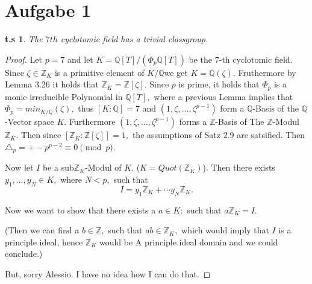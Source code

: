 \documentclass[10pt,a4paper]{article}
\date{\today}
\newtheorem*{zz*}{t.s}
\newcommand{\QQ}{\mathbb{Q}}
\newcommand{\ZZ}{\mathbb{Z}}
\begin{document}
	
	\section*{Aufgabe 1}
	\begin{zz*}
		The $7th$ cyclotomic field has a trivial classgroup.
	\end{zz*}
	\begin{proof}
		Let $p = 7$ and let $K = \QQ[T]/(\Phi_p\QQ[T])$ be the $7$-th cyclotomic field. Since $\zeta\in \ZZ_K$  is a primitive element of $K/\QQ$we get $K = \QQ(\zeta).$ Fruthermore by Lemma 3.26 it holds that $\ZZ_K = \ZZ[\zeta].$ Since $p$ is prime, it holds that $\Phi_p$ is a monic irreducible Polynomial in $\QQ[T],$ where a previous Lemma implies that $\Phi_p = min_{K/\QQ}(\zeta),$ thus $[K: \QQ] = 7$ and $(1, \zeta,\dots, \zeta^{p-1})$ form a $\QQ$-Basis of the $\QQ$-Vector space $K.$ Furthermore $(1, \zeta,\dots, \zeta^{p-1})$ forms a $\ZZ$-Basis  of The $\ZZ$-Modul $\ZZ_K.$ Then since $[\ZZ_K:\ZZ[\zeta]] = 1,$ the assumptions of Satz 2.9 are satsified. Then $\triangle_p = +-p^{p-2}\equiv 0 \pmod{p}.$ \vspace{0.2cm}
		
		Now let $I$ be a sub$\ZZ_K$-Modul of $K.$ ($K = Quot(\ZZ_K)$). Then there exists $y_1,\dots, y_N\in K,$ where $N<p,$ such that
		\[I = y_1\ZZ_K+\cdots y_N\ZZ_K.\]
		
		Now we want to show that there exists a $a\in K:$ such that $a\ZZ_K = I.$
		
		(Then we can find a $b\in\ZZ,$ such that $ab\in \ZZ_K,$ which would imply that $I$ is a principle ideal, hence $\ZZ_K$ would be A principle ideal domain and we could conclude.)
		
		But, sorry Alessio. I have no idea how I can do that.
	\end{proof}
	\pagebreak
	
\end{document}
